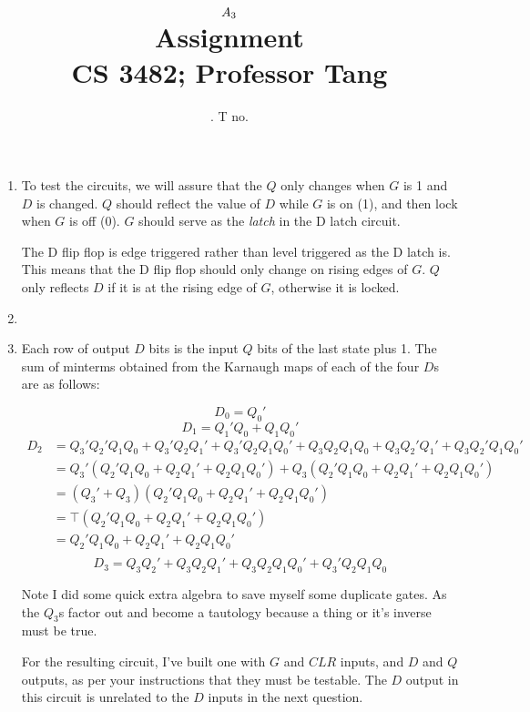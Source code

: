 \documentclass[11pt]{article}
\title{
	$A_{3}$ \\
	{\large Assignment \ass\\
	CS 3482; Professor Tang}
}
\author{
	\name. T no. \tno
}
\begin{document}
\maketitle

\begin{enumerate}
\item {
	To test the circuits, we will assure that the $Q$ only changes when $G$
	is 1 and $D$ is changed. $Q$ should reflect the value of $D$ while $G$
	is on (1), and then lock when $G$ is off (0). $G$ should serve as the {\it latch}
	in the D latch circuit.

	The D flip flop is edge triggered rather than level triggered as the
	D latch is. This means that the D flip flop should only change on rising
	edges of $G$. $Q$ only reflects $D$ if it is at the rising edge of $G$,
	otherwise it is locked.
}
\item{}
\item{
	Each row of output $D$ bits is the input $Q$ bits of the last state
	plus 1. The sum of minterms obtained from the Karnaugh maps of each of
	the four $D$s are as follows:

	\[
		D_{0}=Q_{0}'
	\] \[
		D_{1}=Q_{1}'Q_{0}+Q_{1}Q_{0}'
	\] \[
		\begin{aligned}
		D_{2}&=Q_{3}'Q_{2}'Q_{1}Q_{0}+Q_{3}'Q_{2}Q_{1}'+Q_{3}'Q_{2}Q_{1}Q_{0}'
			+Q_{3}Q_{2}Q_{1}Q_{0}+Q_{3}Q_{2}'Q_{1}'+Q_{3}Q_{2}'Q_{1}Q_{0}' \\
			& = Q_{3}'(Q_{2}'Q_{1}Q_{0}+Q_{2}Q_{1}'+Q_{2}Q_{1}Q_{0}')
				+ Q_{3}(Q_{2}'Q_{1}Q_{0}+Q_{2}Q_{1}'+Q_{2}Q_{1}Q_{0}') \\
			& = (Q_{3}'+Q_{3})(Q_{2}'Q_{1}Q_{0}+Q_{2}Q_{1}'+Q_{2}Q_{1}Q_{0}') \\
			& = \top(Q_{2}'Q_{1}Q_{0}+Q_{2}Q_{1}'+Q_{2}Q_{1}Q_{0}') \\
			& = Q_{2}'Q_{1}Q_{0}+Q_{2}Q_{1}'+Q_{2}Q_{1}Q_{0}' \\
		\end{aligned}
	\] \[
		D_{3}=Q_{3}Q_{2}'+Q_{3}Q_{2}Q_{1}'+Q_{3}Q_{2}Q_{1}Q_{0}'
			+Q_{3}'Q_{2}Q_{1}Q_{0}
	\]

	Note I did some quick extra algebra to save myself some duplicate gates. As
	the $Q_{3}$s factor out and become a tautology because a thing or it's inverse
	must be true.

	For the resulting circuit, I've built one with $G$ and $CLR$ inputs, and $D$
	and $Q$ outputs, as per your instructions that they must be testable. The $D$
	output in this circuit is unrelated to the $D$ inputs in the next question.

}
\end{enumerate}
\end{document}
